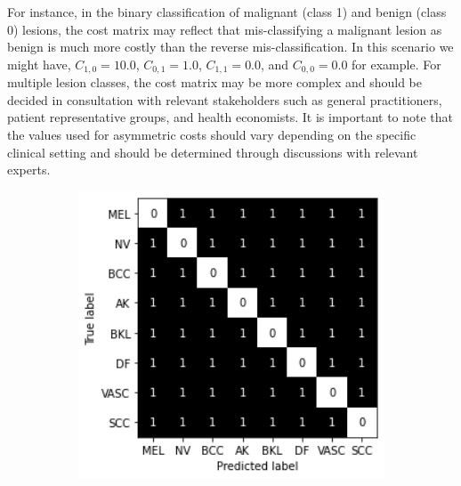 For instance, in the binary classification of malignant (class 1) and benign (class 0) lesions, the cost matrix may reflect that mis-classifying a malignant lesion as benign is much more costly than the reverse mis-classification. In this scenario we might have, $C_{1,0} = 10.0$, $C_{0,1} = 1.0$, $C_{1,1} = 0.0$, and $C_{0,0} = 0.0$ for example. For multiple lesion classes, the cost matrix may be more complex and should be decided in consultation with relevant stakeholders such as general practitioners, patient representative groups, and health economists. It is important to note that the values used for asymmetric costs should vary depending on the specific clinical setting and should be determined through discussions with relevant experts.

\begin{figure}[!h]
	\centering
	\begin{subfigure}{0.49\textwidth}
		\centering
		\includegraphics[width=1\textwidth]{images/cost_matrix_1.png}
		\caption{}
		\label{fig:multiclasssymcosts}
	\end{subfigure}
	\begin{subfigure}{0.49\textwidth}
		\centering

\end{subfigure}
\end{figure}
